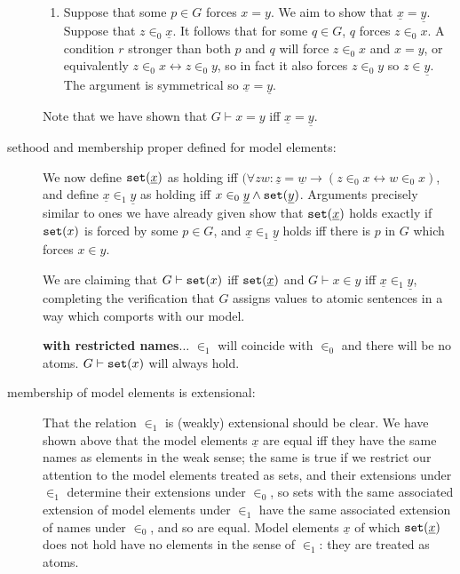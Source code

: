 \documentclass[12pt]{book}
\begin{document}
\begin{description}
\begin{enumerate}
\item Suppose that some $p \in G$ forces $x=y$.  We aim to show that $\underline{x}=\underline{y}$.  Suppose that $z \in_0 \underline{x}$.  It follows that for some $q \in G$,
$q$ forces $z \in_0 x$.  A condition $r$ stronger than both $p$ and $q$ will force $z \in_0 x$ and $x=y$, or equivalently $z \in_0 x \leftrightarrow z\in_0 y$, so in fact it also forces $z \in_0 y$ so $z \in \underline{y}$.  The argument is symmetrical so $\underline{x} = \underline{y}$.

\end{enumerate}

Note that we have shown that $G \vdash x=y$ iff $\underline{x} = \underline{y}$.

\item[sethood and membership proper defined for model elements:]  We now define ${\tt set}(\underline{x})$ as holding iff $(\forall zw: \underline{z} = \underline{w} \rightarrow (z \in_0 x \leftrightarrow w \in_0 x)$, and define
$\underline{x} \in_1 \underline{y}$ as holding iff $x \in_0 \underline{y} \wedge {\tt set}(\underline{y})$.   Arguments precisely similar to ones we have already given show that ${\tt set}(\underline{x})$ holds exactly if ${\tt set}(x)$ is forced by some $p \in G$, and $\underline{x} \in_1 \underline{y}$ holds iff there is $p$ in $G$ which forces $x \in y$.

We are claiming that $G \vdash {\tt set}(x)$ iff ${\tt set}(\underline{x})$ and $G \vdash x \in y$ iff $\underline{x} \in_1 \underline{y}$, completing the verification that $G$ assigns values to atomic sentences in a way which comports with our model.

{\bf with restricted names$\ldots$}  $\in_1$ will coincide with $\in_0$ and there will be no atoms.  $G \vdash {\tt set}(x)$ will always hold.

\item[membership of model elements is extensional:]  That the relation $\in_1$ is (weakly) extensional should be clear.  We have shown above that the model elements $\underline{x}$ are equal  iff they have the same names
as elements in the weak sense;  the same is true if we restrict our attention to the model elements treated as sets, and their extensions under $\in_1$ determine their extensions under $\in_0$, so sets with the same associated extension of model elements under $\in_1$ have the same associated extension of names under $\in_0$, and so are equal.  Model elements
$\underline{x}$ of which ${\tt set}(\underline{x})$ does not hold have no elements in the sense of $\in_1$:  they are treated as atoms.


\end{description}
\end{document}
